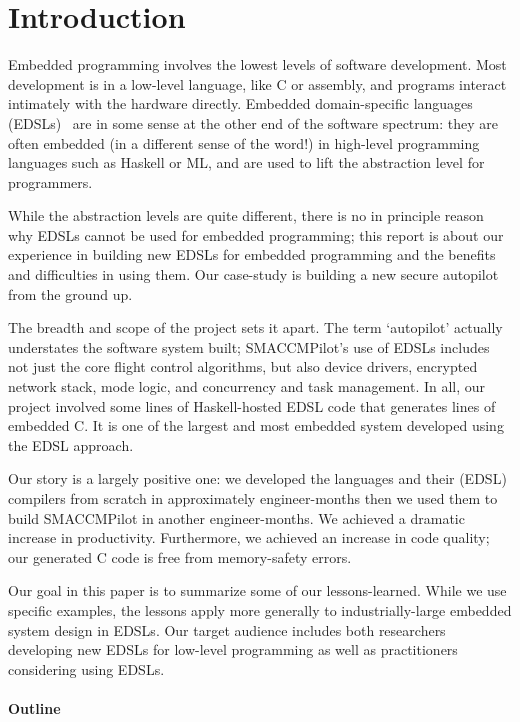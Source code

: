 \section{Introduction}

Embedded programming involves the lowest levels of software development.  Most
development is in a low-level language, like C or assembly, and programs
interact intimately with the hardware directly.  Embedded domain-specific
languages (EDSLs)~\cite{} are in some sense at the other end of the software
spectrum: they are often embedded (in a different sense of the word!) in
high-level programming languages such as Haskell or ML, and are used to
lift the abstraction level for programmers.

While the abstraction levels are quite different, there is no in principle
reason why EDSLs cannot be used for embedded programming; this report
is about our experience in building new EDSLs for embedded programming and the
benefits and difficulties in using them.  Our case-study is building a new
secure autopilot from the ground up.

The breadth and scope of the project sets it apart.  The term `autopilot'
actually understates the software system built; SMACCMPilot's use of EDSLs
includes not just the core flight control algorithms, but also device drivers,
encrypted network stack, mode logic, and concurrency and task management.  In
all, our project involved some  lines of Haskell-hosted EDSL code that
generates  lines of embedded C.  It is one of the largest and most
embedded system developed using the EDSL approach.

Our story is a largely positive one: we developed the languages and their (EDSL)
compilers from scratch in approximately  engineer-months then we used
them to build SMACCMPilot in another  engineer-months.  We achieved a
dramatic increase in productivity.  Furthermore, we achieved an increase in
code quality; our generated C code is free from memory-safety errors.

Our goal in this paper is to summarize some of our lessons-learned.  While we
use specific examples, the lessons apply more generally to industrially-large
embedded system design in EDSLs.  Our target audience includes both researchers
developing new EDSLs for low-level programming as well as practitioners
considering using EDSLs.




\paragraph{Outline}

